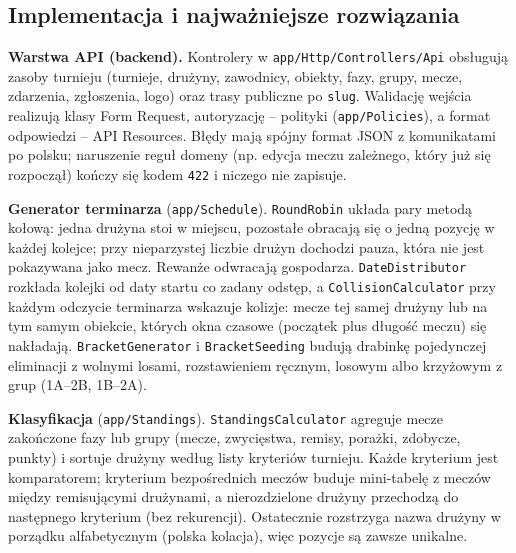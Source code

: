 \documentclass[11pt,a4paper,oneside]{article}
\newif\ifpodpowiedzi
\newcommand{\podpowiedz}[1]{\ifpodpowiedzi\par\begingroup\small\color{hintcolor}\textit{Wskazówka: #1}\par\endgroup\fi}
\begin{document}
\subsection{Implementacja i najważniejsze rozwiązania}
\podpowiedz{Dla projektu programistycznego opisz istotne moduły, klasy, funkcje, interfejsy i algorytmy. Podaj znaczenie parametrów, wyniki, ograniczenia i obsługę błędów tam, gdzie jest to potrzebne. Nie wymaga się przepisywania całego kodu ani opisu każdej zmiennej. Dokumentację generowaną z kodu można dołączyć lub wskazać jako osobny materiał.}
\podpowiedz{Dla projektu bez kodu opisz odpowiednie metody wykonania, np. modelowanie, rigging, animację, oświetlenie, rendering i montaż. Podaj istotne ustawienia i uzasadnij ich dobór. Usuń wskazówki nieodnoszące się do projektu.}
\textbf{Warstwa API (backend).} Kontrolery w \texttt{app/Http/Controllers/Api} obsługują zasoby turnieju (turnieje, drużyny, zawodnicy, obiekty, fazy, grupy, mecze, zdarzenia, zgłoszenia, logo) oraz trasy publiczne po \texttt{slug}. Walidację wejścia realizują klasy Form Request, autoryzację -- polityki (\texttt{app/Policies}), a format odpowiedzi -- API Resources. Błędy mają spójny format JSON z komunikatami po polsku; naruszenie reguł domeny (np. edycja meczu zależnego, który już się rozpoczął) kończy się kodem \texttt{422} i niczego nie zapisuje.

\textbf{Generator terminarza} (\texttt{app/Schedule}). \texttt{RoundRobin} układa pary metodą kołową: jedna drużyna stoi w miejscu, pozostałe obracają się o jedną pozycję w każdej kolejce; przy nieparzystej liczbie drużyn dochodzi pauza, która nie jest pokazywana jako mecz. Rewanże odwracają gospodarza. \texttt{DateDistributor} rozkłada kolejki od daty startu co zadany odstęp, a \texttt{CollisionCalculator} przy każdym odczycie terminarza wskazuje kolizje: mecze tej samej drużyny lub na tym samym obiekcie, których okna czasowe (początek plus długość meczu) się nakładają. \texttt{BracketGenerator} i \texttt{BracketSeeding} budują drabinkę pojedynczej eliminacji z wolnymi losami, rozstawieniem ręcznym, losowym albo krzyżowym z grup (1A--2B, 1B--2A).

\textbf{Klasyfikacja} (\texttt{app/Standings}). \texttt{StandingsCalculator} agreguje mecze zakończone fazy lub grupy (mecze, zwycięstwa, remisy, porażki, zdobycze, punkty) i sortuje drużyny według listy kryteriów turnieju. Każde kryterium jest komparatorem; kryterium bezpośrednich meczów buduje mini-tabelę z meczów między remisującymi drużynami, a nierozdzielone drużyny przechodzą do następnego kryterium (bez rekurencji). Ostatecznie rozstrzyga nazwa drużyny w porządku alfabetycznym (polska kolacja), więc pozycje są zawsze unikalne.
\end{document}
